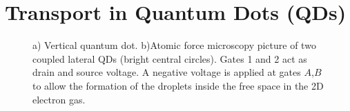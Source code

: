 \section{Transport in Quantum Dots (QDs)}
\begin{figure}[hbt]
    \centering
    \hspace{6mm}
    \caption{ a) Vertical quantum dot.  b)Atomic force microscopy
    picture of two coupled lateral QDs (bright central circles). Gates 1 and 2 act as drain and source voltage. A negative
    voltage is applied at gates $A$,$B$ to allow the formation of the droplets inside the free space in the 2D electron gas. \protect{} }
\end{figure}

